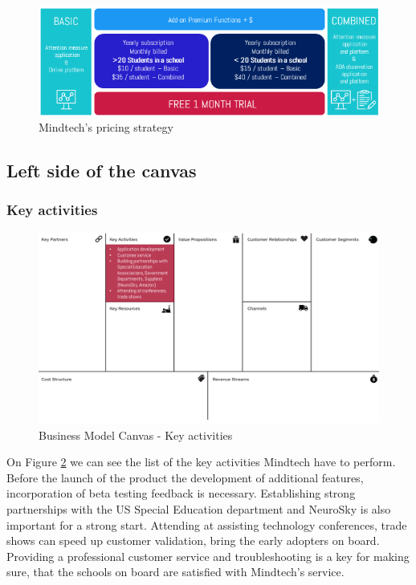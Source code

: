 \documentclass[letterpaper,10pt]{article}
\let\oldsubsection\subsection
\renewcommand{\subsection}{\def\cursectioning{subsection}\oldsubsection}
\begin{document}
\begin{figure}[!htb]
\centering
\includegraphics[scale=0.7]{coststructure.PNG}
\caption{Mindtech's pricing strategy}
\label{img:coststructure}
\end{figure}

\subsection{Left side of the canvas}

\subsubsection{Key activities}

\begin{figure}[!htb]
\centering
\includegraphics[scale=0.5]{activ.PNG}
\caption{Business Model Canvas - Key activities}
\label{img:BMC_keyact}
\end{figure}


On Figure \ref{img:BMC_keyact} we can see the list of the key activities Mindtech have to perform. Before the launch of the product the development of additional features, incorporation of beta testing feedback is necessary. Establishing strong partnerships with the US Special Education department and NeuroSky is also important for a strong start. Attending at assisting technology conferences, trade shows can speed up customer validation, bring the early adopters on board. Providing a professional customer service and troubleshooting is a key for making sure, that the schools on board are satisfied with Mindtech's service.                                                                                        
\end{document}
